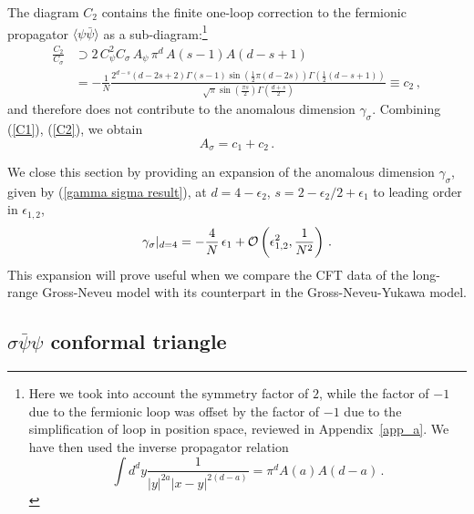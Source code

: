 \documentclass[aps,amsmath,amssymb,prd,showpacs,floatfix,preprint,superscriptaddress,nofootinbib,12pt]{article}
\begin{document}
The diagram $C_2$ contains the finite one-loop correction to 
the fermionic propagator $\langle\psi\bar\psi\rangle$ as a sub-diagram:\footnote{
Here we took into account the symmetry factor of $2$,
while the factor of $-1$ due to the fermionic loop was offset
by the factor of $-1$ due to the simplification
of loop in position space, reviewed in Appendix~\ref{app_a}.
We have then used the inverse propagator relation
\begin{equation}
\int d^dy\frac{1}{|y|^{2a}|x-y|^{2(d-a)}}=\pi^d A(a)A(d-a)\,.
\end{equation}
}
\begin{equation}
\label{C2}
\begin{aligned}
\frac{C_2}{C_\sigma} &\supset 2\,C_\psi^2C_\sigma\, A_\psi \,\pi^d\, A(s-1)A(d-s+1)\\
&=-\frac{1}{N}\frac{2^{d-s} (d-2 s+2)\Gamma (s-1) \sin \left(\frac{1}{2} \pi  (d-2 s)\right) \Gamma \left(\frac{1}{2} (d-s+1)\right)}{\sqrt{\pi }  \sin \left(\frac{\pi  s}{2}\right)  \Gamma \left(\frac{d+s}{2}\right)}\equiv c_2\,,
\end{aligned}
\end{equation}
and therefore does not contribute to the anomalous dimension $\gamma_\sigma$.
Combining (\ref{C1}), (\ref{C2}), we obtain
\begin{equation}
\label{A sigma}
A_\sigma = c_1 + c_2\,.
\end{equation}

We close this section by providing an expansion of the anomalous dimension $\gamma_\sigma$,
given by (\ref{gamma sigma result}), at $d=4-\epsilon_2$, $s=2-\epsilon_2/2+\epsilon_1$
to leading order in $\epsilon_{1,2}$,
\begin{equation}
\label{gamma sigma expanded result}
\gamma_\sigma|_{d=4} = - \frac{4}{N}\,\epsilon_1+{\cal O}\left(\epsilon_{1,2}^2,\frac{1}{N^2}\right)\,.
\end{equation}
 This expansion will prove useful when we compare the CFT data of the long-range Gross-Neveu
 model with its counterpart in the Gross-Neveu-Yukawa model.
 

\subsection{$\sigma\bar\psi\psi$ conformal triangle}
\label{sec: GN sigma psi psi conformal triangle}
\end{document}

